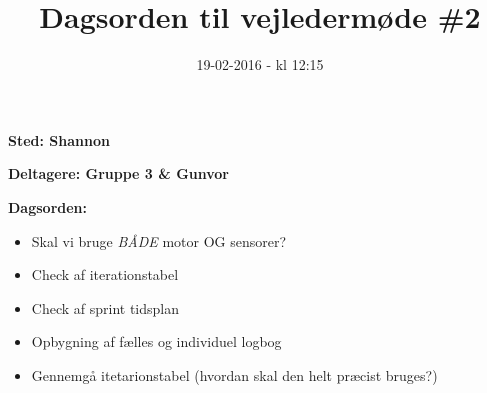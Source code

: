 \documentclass{article}
\title{Dagsorden til vejledermøde \#2}
\date{19-02-2016 - kl 12:15}
\begin{document}
	\maketitle

	\textbf{Sted: Shannon}
	
	\textbf{Deltagere: Gruppe 3 \& Gunvor}
	
	\textbf{Dagsorden:}
	\begin{itemize}
		\item Skal vi bruge \textit{BÅDE} motor OG sensorer?
		\item Check af iterationstabel
		\item Check af sprint tidsplan
		\item Opbygning af fælles og individuel logbog
		\item Gennemgå itetarionstabel (hvordan skal den helt præcist bruges?)
	\end{itemize}
\end{document}
